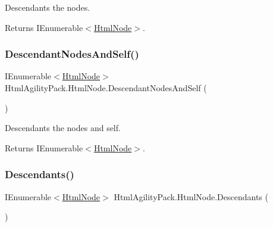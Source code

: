 Descendants the nodes. 

\begin{DoxyReturn}{Returns}
I\+Enumerable$<$\hyperlink{class_html_agility_pack_1_1_html_node}{Html\+Node}$>$.
\end{DoxyReturn}
\mbox{\label{class_html_agility_pack_1_1_html_node_a314cb7d75d92db97963bdd2690c1c044}} 
\subsubsection{\texorpdfstring{Descendant\+Nodes\+And\+Self()}{DescendantNodesAndSelf()}}
{\footnotesize\ttfamily I\+Enumerable$<$\hyperlink{class_html_agility_pack_1_1_html_node}{Html\+Node}$>$ Html\+Agility\+Pack.\+Html\+Node.\+Descendant\+Nodes\+And\+Self (\begin{DoxyParamCaption}{ }\end{DoxyParamCaption})\hspace{0.3cm}{\ttfamily [inline]}}



Descendants the nodes and self. 

\begin{DoxyReturn}{Returns}
I\+Enumerable$<$\hyperlink{class_html_agility_pack_1_1_html_node}{Html\+Node}$>$.
\end{DoxyReturn}
\mbox{\label{class_html_agility_pack_1_1_html_node_a33b417336b8282b4240007b636513afa}} 
\subsubsection{\texorpdfstring{Descendants()}{Descendants()}\hspace{0.1cm}{\footnotesize\ttfamily [1/2]}}
{\footnotesize\ttfamily I\+Enumerable$<$\hyperlink{class_html_agility_pack_1_1_html_node}{Html\+Node}$>$ Html\+Agility\+Pack.\+Html\+Node.\+Descendants (\begin{DoxyParamCaption}{ }\end{DoxyParamCaption})\hspace{0.3cm}{\ttfamily [inline]}}



